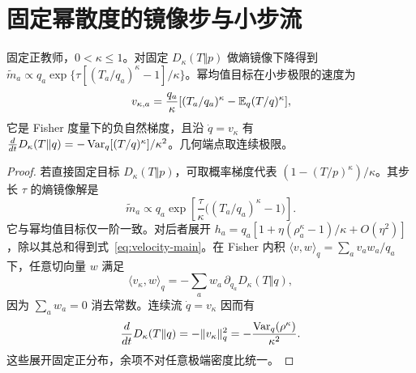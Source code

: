\section{固定幂散度的镜像步与小步流}
\begin{proposition}[固定幂散度的镜像步与自然梯度流]
固定正教师，$0<\kappa\le1$。对固定 $D_\kappa(T\Vert p)$ 做熵镜像下降得到
$\widetilde m_a\propto q_a\exp\{\tau[(T_a/q_a)^\kappa-1]/\kappa\}$。幂均值目标在小步极限的速度为
\begin{equation}
v_{\kappa,a}=\frac{q_a}{\kappa}[(T_a/q_a)^\kappa-\mathbb E_q(T/q)^\kappa],
\end{equation}
它是 Fisher 度量下的负自然梯度，且沿 $\dot q=v_\kappa$ 有 $\frac d{dt}D_\kappa(T\Vert q)=-\operatorname{Var}_q[(T/q)^\kappa]/\kappa^2$。几何端点取连续极限。
\end{proposition}
\begin{proof}
若直接固定目标 $D_\kappa(T\Vert p)$，可取概率梯度代表 $(1-(T/p)^\kappa)/\kappa$。其步长 $\tau$ 的熵镜像解是
\begin{equation}
\widetilde m_a\propto q_a
\exp\left[\frac{\tau}{\kappa}\big((T_a/q_a)^\kappa-1\big)\right].
\end{equation}
它与幂均值目标仅一阶一致。对后者展开 $h_a=q_a[1+\eta(\rho_a^\kappa-1)/\kappa+O(\eta^2)]$，除以其总和得到式~\eqref{eq:velocity-main}。在 Fisher 内积 $\langle v,w\rangle_q=\sum_av_aw_a/q_a$ 下，任意切向量 $w$ 满足
\begin{equation}
\langle v_\kappa,w\rangle_q
=-\sum_aw_a\,\partial_{q_a}D_\kappa(T\Vert q),
\end{equation}
因为 $\sum_aw_a=0$ 消去常数。连续流 $\dot q=v_\kappa$ 因而有
\begin{equation}
\frac d{dt}D_\kappa(T\Vert q)
=-\|v_\kappa\|_q^2=-\frac{\operatorname{Var}_q(\rho^\kappa)}{\kappa^2}.
\end{equation}
这些展开固定正分布，余项不对任意极端密度比统一。
\end{proof}
